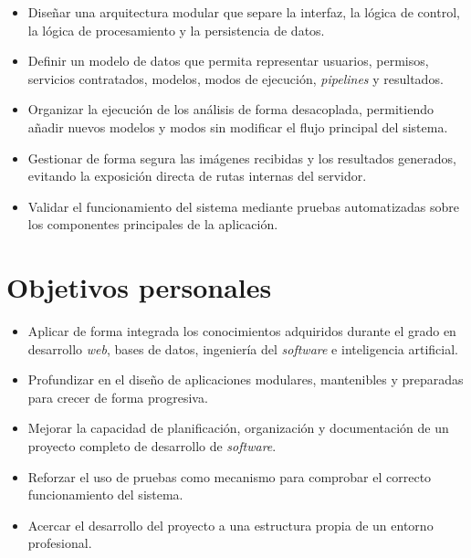 \begin{itemize}
	\item Diseñar una arquitectura modular que separe la interfaz, la lógica de control, la lógica de procesamiento y la persistencia de datos.
	\item Definir un modelo de datos que permita representar usuarios, permisos, servicios contratados, modelos, modos de ejecución, \textit{pipelines} y resultados.
	\item Organizar la ejecución de los análisis de forma desacoplada, permitiendo añadir nuevos modelos y modos sin modificar el flujo principal del sistema.
	\item Gestionar de forma segura las imágenes recibidas y los resultados generados, evitando la exposición directa de rutas internas del servidor.
	\item Validar el funcionamiento del sistema mediante pruebas automatizadas sobre los componentes principales de la aplicación.
\end{itemize}

\section{Objetivos personales}

\begin{itemize}
	\item Aplicar de forma integrada los conocimientos adquiridos durante el grado en desarrollo \textit{web}, bases de datos, ingeniería del \textit{software} e inteligencia artificial.
	\item Profundizar en el diseño de aplicaciones modulares, mantenibles y preparadas para crecer de forma progresiva.
	\item Mejorar la capacidad de planificación, organización y documentación de un proyecto completo de desarrollo de \textit{software}.
	\item Reforzar el uso de pruebas como mecanismo para comprobar el correcto funcionamiento del sistema.
	\item Acercar el desarrollo del proyecto a una estructura propia de un entorno profesional.
\end{itemize}